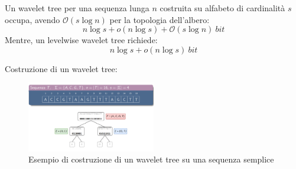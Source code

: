 Un wavelet tree per una sequenza lunga $n$ costruita su alfabeto di cardinalità
$s$ occupa, avendo $\mathcal{O}(s \log n)$ per la topologia dell'albero:
\begin{equation}
    n \log s + o(n \log s) + \mathcal{O}(s \log n) \ bit
\end{equation}
Mentre, un levelwise wavelet tree richiede:
\begin{equation}
    n \log s + o(n \log s) \ bit
\end{equation}
\begin{esempio}
    Costruzione di un wavelet tree:
    \begin{figure}[!ht]
        \centering
        \includegraphics[width=0.5\textwidth]{img/Strutture Dati/wavelet tree.png}
        \caption{Esempio di costruzione di un wavelet tree su una sequenza semplice}
    \end{figure}
\end{esempio}
